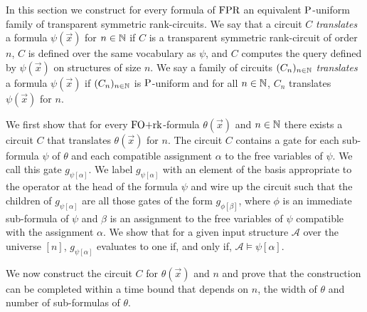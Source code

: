 \documentclass[../paper.tex]{subfiles}
\begin{document}
In this section we construct for every formula of $\text{\upshape FPR}$ an equivalent
$\mathrm{P}$-uniform family of transparent symmetric rank-circuits. We say that a
circuit $C$ \emph{translates} a formula $\psi(\vec{x})$ for $n \in \mathbb{N}$ if $C$
is a transparent symmetric rank-circuit of order $n$, $C$ is defined over the
same vocabulary as $\psi$, and $C$ computes the query defined by $\psi(\vec{x})$
on structures of size $n$. We say a family of circuits $(C_n)_{n \in \mathbb{N}}$
\emph{translates} a formula $\psi (\vec{x})$ if $(C_n)_{n \in \mathbb{N}}$ is
$\mathrm{P}$-uniform and for all $n \in \mathbb{N}$, $C_n$ translates $\psi(\vec{x})$ for
$n$.

We first show that for every $\text{\upshape FO+rk}$-formula $\theta(\vec{x})$ and $n \in \mathbb{N}$
there exists a circuit $C$ that translates $\theta(\vec{x})$ for $n$. The
circuit $C$ contains a gate for each sub-formula $\psi$ of $\theta$ and each
compatible assignment $\alpha$ to the free variables of $\psi$. We call this
gate $g_{\psi[\alpha]}$. We label $g_{\psi[\alpha]}$ with an element of the
basis appropriate to the operator at the head of the formula $\psi$ and wire up
the circuit such that the children of $g_{\psi[\alpha]}$ are all those gates of
the form $g_{\phi[\beta]}$, where $\phi$ is an immediate sub-formula of $\psi$
and $\beta$ is an assignment to the free variables of $\psi$ compatible with the
assignment $\alpha$. We show that for a given input structure $\mathcal{A}$ over
the universe $[n]$, $g_{\psi[\alpha]}$ evaluates to one if, and only if,
$\mathcal{A} \models \psi[\alpha]$.

We now construct the circuit $C$ for $\theta(\vec{x})$ and $n$ and prove that
the construction can be completed within a time bound that depends on $n$, the
width of $\theta$ and number of sub-formulas of $\theta$.
\end{document}

